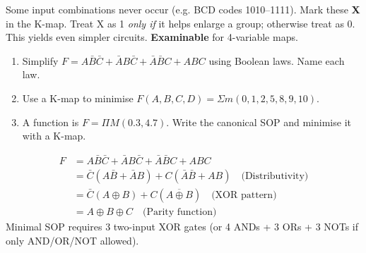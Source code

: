 \documentclass[11pt]{article}
\begin{document}
\begin{experience}
Some input combinations never occur (e.g. BCD codes 1010--1111). Mark these \textbf{X} in the K-map. Treat X as 1 \emph{only if} it helps enlarge a group; otherwise treat as 0. This yields even simpler circuits. \textbf{Examinable} for 4-variable maps.
\end{experience}

\begin{exercice}
\begin{enumerate}
\item Simplify $F=A\bar{B}\bar{C}+\bar{A}B\bar{C}+\bar{A}\bar{B}C+ABC$ using Boolean laws. Name each law.
\item Use a K-map to minimise $F(A,B,C,D)=\Sigma m(0,1,2,5,8,9,10)$.
\item A function is $F=\Pi M(0.3,4.7)$. Write the canonical SOP and minimise it with a K-map.
\end{enumerate}
\end{exercice}

\begin{corrige}[Exercise 1]
\begin{align*}
F &= A\bar{B}\bar{C}+\bar{A}B\bar{C}+\bar{A}\bar{B}C+ABC \\
  &= \bar{C}(A\bar{B}+\bar{A}B) + C(\bar{A}\bar{B}+AB) \quad \text{(Distributivity)} \\
  &= \bar{C}(A\oplus B) + C(\overline{A\oplus B}) \quad \text{(XOR pattern)} \\
  &= A\oplus B\oplus C \quad \text{(Parity function)}
\end{align*}
Minimal SOP requires 3 two-input XOR gates (or 4 ANDs + 3 ORs + 3 NOTs if only AND/OR/NOT allowed).
\end{corrige}
\end{document}
